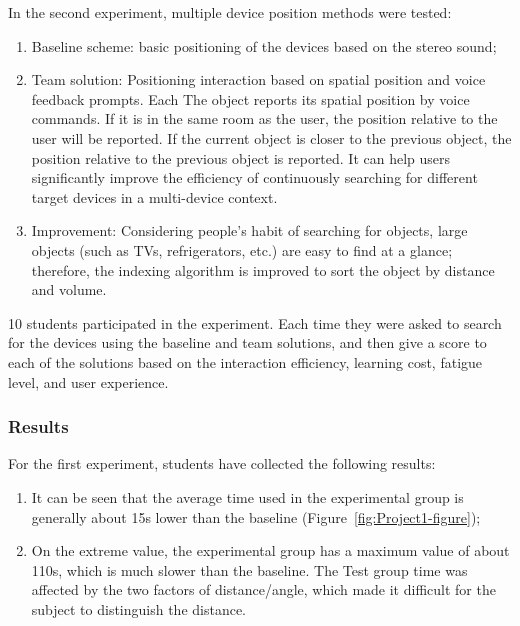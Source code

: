 In the second experiment, multiple device position methods were tested:
\begin{enumerate}
    \item Baseline scheme: basic positioning of the devices based on the stereo sound;
    \item Team solution: Positioning interaction based on spatial position and voice feedback prompts. Each The object reports its spatial position by voice commands. If it is in the same room as the user, the position relative to the user will be reported. If the current object is closer to the previous object, the position relative to the previous object is reported. It can help users significantly improve the efficiency of continuously searching for different target devices in a multi-device context.
    \item Improvement: Considering people’s habit of searching for objects, large objects (such as TVs, refrigerators, etc.) are easy to find at a glance; therefore, the indexing algorithm is improved to sort the object by distance and volume.
\end{enumerate}

10 students participated in the experiment. Each time they were asked to search for the devices using the baseline and team solutions, and then give a score to each of the solutions based on the interaction efficiency, learning cost, fatigue level, and user experience. 

\subsubsection{Results}

For the first experiment, students have collected the following results:
\begin{enumerate}
    \item It can be seen that the average time used in the experimental group is generally about 15s lower than the baseline (Figure~\ref{fig:Project1-figure});
    \item On the extreme value, the experimental group has a maximum value of about 110s, which is much slower than the baseline. The Test group time was affected by the two factors of distance/angle, which made it difficult for the subject to distinguish the distance.
\end{enumerate}

